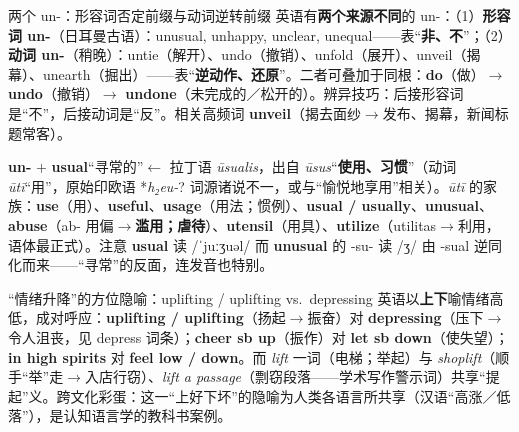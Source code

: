 \documentclass[../main.tex]{subfiles}
\begin{document}


\begin{gram}{两个 un-：形容词否定前缀与动词逆转前缀}
英语有\textbf{两个来源不同}的 un-：（1）\textbf{形容词 un-}（日耳曼古语）：unusual, unhappy, unclear, unequal——表“\textbf{非、不}”；（2）\textbf{动词 un-}（稍晚）：untie（解开）、undo（撤销）、unfold（展开）、unveil（揭幕）、unearth（掘出）——表“\textbf{逆动作、还原}”。二者可叠加于同根：\textbf{do}（做）$\to$ \textbf{undo}（撤销）$\to$ \textbf{undone}（未完成的／松开的）。辨异技巧：后接形容词是“不”，后接动词是“反”。相关高频词 \textbf{unveil}（揭去面纱$\to$发布、揭幕，新闻标题常客）。
\end{gram}

\begin{origin}
\textbf{un-} $+$ \textbf{usual}“寻常的”$\leftarrow$ 拉丁语 \textit{ūsualis}，出自 \textit{ūsus}“\textbf{使用、习惯}”（动词 \textit{ūtī}“用”，原始印欧语 *\textit{h₂eu-}? 词源诸说不一，或与“愉悦地享用”相关）。\textit{ūtī} 的家族：\textbf{use}（用）、\textbf{useful}、\textbf{usage}（用法；惯例）、\textbf{usual / usually}、\textbf{unusual}、\textbf{abuse}（ab- 用偏$\to$\textbf{滥用；虐待}）、\textbf{utensil}（用具）、\textbf{utilize}（utilitas$\to$利用，语体最正式）。注意 \textbf{usual} 读 /ˈjuːʒuəl/ 而 \textbf{unusual} 的 -su- 读 /ʒ/ 由 -sual 逆同化而来——“寻常”的反面，连发音也特别。
\end{origin}



\begin{gram}{“情绪升降”的方位隐喻：uplifting / uplifting vs.\ depressing}
英语以\textbf{上下}喻情绪高低，成对呼应：\textbf{uplifting / uplifting}（扬起$\to$振奋）对 \textbf{depressing}（压下$\to$令人沮丧，见 depress 词条）；\textbf{cheer sb up}（振作）对 \textbf{let sb down}（使失望）；\textbf{in high spirits} 对 \textbf{feel low / down}。而 \textit{lift} 一词（电梯；举起）与 \textit{shoplift}（顺手“举”走$\to$入店行窃）、\textit{lift a passage}（剽窃段落——学术写作警示词）共享“提起”义。跨文化彩蛋：这一“上好下坏”的隐喻为人类各语言所共享（汉语“高涨／低落”），是认知语言学的教科书案例。
\end{gram}
\end{document}

